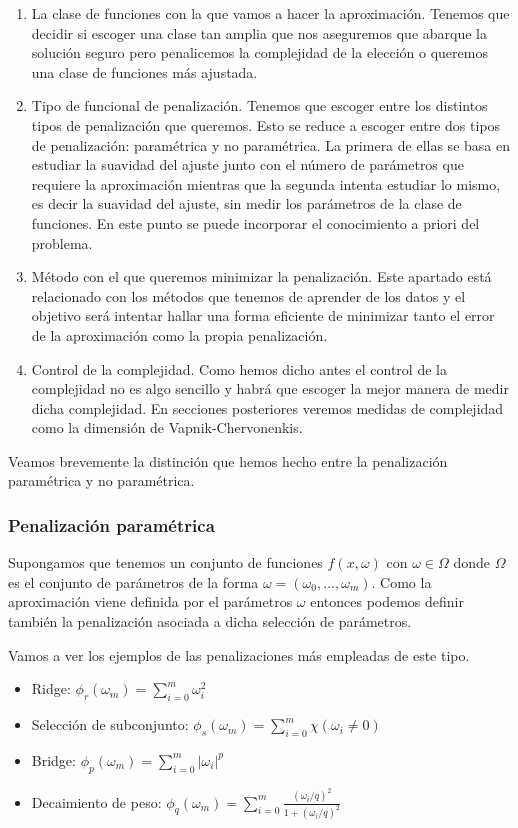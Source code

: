\begin{enumerate}
	\item La clase de funciones con la que vamos a hacer la aproximación. Tenemos que decidir si escoger una clase tan amplia que nos aseguremos que abarque la solución seguro pero penalicemos la complejidad de la elección o queremos una clase de funciones más ajustada.
	\item Tipo de funcional de penalización. Tenemos que escoger entre los distintos tipos de penalización que queremos. Esto se reduce a escoger entre dos tipos de penalización: paramétrica y no paramétrica. La primera de ellas se basa en estudiar la suavidad del ajuste junto con el número de parámetros que requiere la aproximación mientras que la segunda intenta estudiar lo mismo, es decir la suavidad del ajuste, sin medir los parámetros de la clase de funciones. En este punto se puede incorporar el conocimiento a priori del problema.
	\item Método con el que queremos minimizar la penalización. Este apartado está relacionado con los métodos que tenemos de aprender de los datos y el objetivo será intentar hallar una forma eficiente de minimizar tanto el error de la aproximación como la propia penalización.
	\item Control de la complejidad. Como hemos dicho antes el control de la complejidad no es algo sencillo y habrá que escoger la mejor manera de medir dicha complejidad. En secciones posteriores veremos medidas de complejidad como la dimensión de Vapnik-Chervonenkis.
\end{enumerate}

Veamos brevemente la distinción que hemos hecho entre la penalización paramétrica y no paramétrica.

\subsubsection{Penalización paramétrica}

Supongamos que tenemos un conjunto de funciones $f(x,\omega)$ con $\omega \in \Omega$ donde $\Omega$ es el conjunto de parámetros de la forma $\omega = (\omega_0 , ... , \omega_m)$. Como la aproximación viene definida por el parámetros $\omega$ entonces podemos definir también la penalización asociada a dicha selección de parámetros.

Vamos a ver los ejemplos de las penalizaciones más empleadas de este tipo.

\begin{itemize}
	\item Ridge: $\phi_r (\omega_m) = \sum_{i=0}^{m}\omega_i^2$
	\item Selección de subconjunto: $\phi_s (\omega_m) = \sum_{i=0}^{m}\chi (\omega_i \neq 0)$
	\item Bridge: $\phi_p (\omega_m) = \sum_{i=0}^{m}|\omega_i|^p$
	\item Decaimiento de peso: $\phi_q (\omega_m) = \sum_{i=0}^{m}\frac{(\omega_i / q)^2}{1+(\omega_i / q)^2}$ 
\end{itemize}

